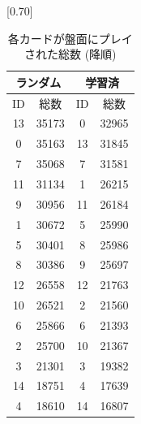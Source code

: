 \documentclass[12pt]{jarticle}
\begin{document}
  \begin{table}[t]
    \centering
    \caption{各カードが盤面にプレイされた総数 (降順)}
    \vspace{-0.3cm}
    \label{table:cardcount}
    \scalebox{0.80}[0.70]{
      \begin{tabular}{|cc|cc|}
        \hline
        \multicolumn{2}{|c|}{ランダム}       & \multicolumn{2}{c|}{学習済}       \\ \hline
        \multicolumn{1}{|c|}{ID} & 総数    & \multicolumn{1}{c|}{ID} & 総数   \\ \hline \hline
        \multicolumn{1}{|c|}{13}  & 35173 & \multicolumn{1}{c|}{0}  & 32965 \\ \hline
        \multicolumn{1}{|c|}{0}  & 35163 & \multicolumn{1}{c|}{13} & 31845 \\ \hline
        \multicolumn{1}{|c|}{7}  & 35068 & \multicolumn{1}{c|}{7}  & 31581 \\ \hline
        \multicolumn{1}{|c|}{11} & 31134 & \multicolumn{1}{c|}{1}  & 26215 \\ \hline
        \multicolumn{1}{|c|}{9} & 30956 & \multicolumn{1}{c|}{11} & 26184 \\ \hline
        \multicolumn{1}{|c|}{1}  & 30672 & \multicolumn{1}{c|}{5}  & 25990 \\ \hline
        \multicolumn{1}{|c|}{5}  & 30401 & \multicolumn{1}{c|}{8}  & 25986 \\ \hline
        \multicolumn{1}{|c|}{8}  & 30386 & \multicolumn{1}{c|}{9}  & 25697 \\ \hline
        \multicolumn{1}{|c|}{12} & 26558 & \multicolumn{1}{c|}{12}  & 21763 \\ \hline
        \multicolumn{1}{|c|}{10} & 26521 & \multicolumn{1}{c|}{2}  & 21560 \\ \hline
        \multicolumn{1}{|c|}{6}  & 25866 & \multicolumn{1}{c|}{6} & 21393 \\ \hline
        \multicolumn{1}{|c|}{2}  & 25700 & \multicolumn{1}{c|}{10}  & 21367 \\ \hline
        \multicolumn{1}{|c|}{3} & 21301 & \multicolumn{1}{c|}{3}  & 19382 \\ \hline
        \multicolumn{1}{|c|}{14}  & 18751 & \multicolumn{1}{c|}{4} & 17639 \\ \hline
        \multicolumn{1}{|c|}{4}  & 18610 & \multicolumn{1}{c|}{14} & 16807 \\ \hline
        \end{tabular}
    }
    \end{table}
\end{document}
